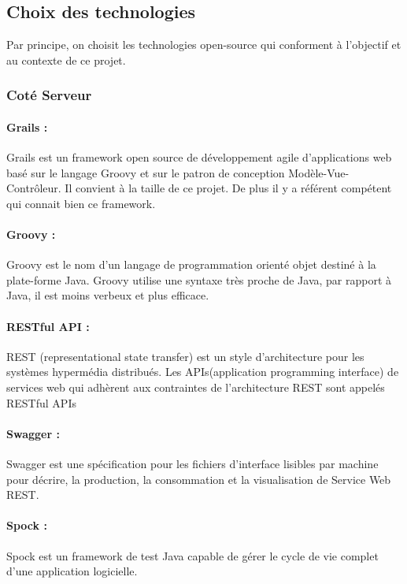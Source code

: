 \subsection{Choix des technologies}

Par principe, on choisit les technologies open-source qui conforment à l'objectif et au contexte de ce projet.

\subsubsection{Coté Serveur}

\paragraph{Grails :}
Grails est un framework open source de développement agile d'applications web basé sur le langage Groovy et sur le patron de conception Modèle-Vue-Contrôleur.
Il convient à la taille de ce projet.
De plus il y a référent compétent qui connait bien ce framework.

\paragraph{Groovy :}
Groovy est le nom d'un langage de programmation orienté objet destiné à la plate-forme Java.
Groovy utilise une syntaxe très proche de Java, par rapport à Java, il est moins verbeux et plus efficace.

\paragraph{RESTful API :}
REST (representational state transfer) est un style d'architecture pour les systèmes hypermédia distribués.
Les APIs(application programming interface) de services web qui adhèrent aux contraintes de l'architecture REST sont appelés RESTful APIs

\paragraph{Swagger :}
Swagger est une spécification pour les fichiers d'interface lisibles par machine pour décrire, la production, la consommation et la visualisation de Service Web REST.

\paragraph{Spock :}
Spock est un framework de test Java capable de gérer le cycle de vie complet d'une application logicielle.

